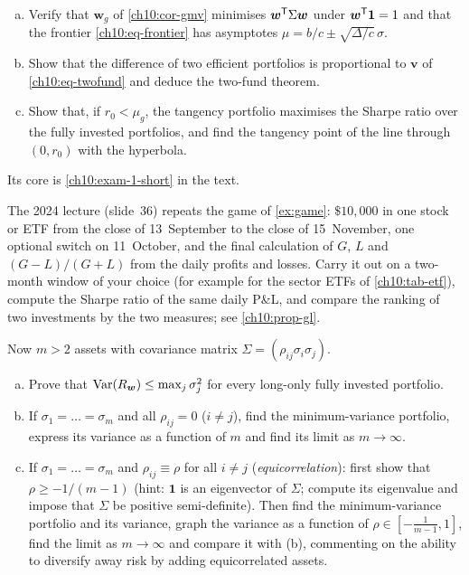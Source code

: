 \begin{paracol}{2}
\begin{exercise}\label{ch10:exam-1}
\leavevmode
\begin{enumerate}[(a)]
  \item Verify that $\bm w_g$ of \cref{ch10:cor-gmv} minimises $\bm w^{\mathsf T}\Sigma\bm w$ under $\bm w^{\mathsf T}\bm 1=1$ and that the frontier
      \eqref{ch10:eq-frontier} has asymptotes $\mu=b/c\pm\sqrt{\Delta/c}\,\sigma$.
  \item Show that the difference of two efficient portfolios is proportional to $\bm v$ of
      \eqref{ch10:eq-twofund} and deduce the two-fund theorem.
  \item Show that, if $r_0<\mu_g$, the tangency portfolio maximises the
      Sharpe ratio over the fully invested portfolios, and find the tangency point of the line through $(0,r_0)$ with the hyperbola.
\end{enumerate}
Its core is \cref{ch10:exam-1-short} in the text.
\end{exercise}

\begin{exercise}\label{ch10:ex-game}
The 2024 lecture (slide~36) repeats the game of \cref{ex:game}: $\$10{,}000$ in one stock or ETF from the close of 13~September to the
close of 15~November, one optional switch on 11~October, and the final calculation of $G$, $L$ and $(G-L)/(G+L)$ from the daily
profits and losses. Carry it out on a two-month window of your choice (for example for the sector ETFs of \cref{ch10:tab-etf}), compute the
Sharpe ratio of the same daily P\&L, and compare the ranking of two investments by the two measures; see \cref{ch10:prop-gl}.
\end{exercise}

\begin{exercise}\label{ch10:ex-ps6-4}
Now $m>2$ assets with covariance matrix $\Sigma=(\rho_{ij}\sigma_i\sigma_j)$.
\begin{enumerate}[(a)]
  \item Prove that $\operatorname{Var}(R_{\bm w})\le\max_j\sigma_j^2$ for every long-only fully invested portfolio.
  \item If $\sigma_1=\dots=\sigma_m$ and all $\rho_{ij}=0$ ($i\neq j$), find the minimum-variance portfolio, express its variance as a function
      of $m$ and find its limit as $m\to\infty$.
  \item If $\sigma_1=\dots=\sigma_m$ and $\rho_{ij}\equiv\rho$ for all $i\neq j$ (\emph{equicorrelation}): first show that
      $\rho\ge-1/(m-1)$ (hint: $\bm 1$ is an eigenvector of $\Sigma$; compute its eigenvalue and impose that $\Sigma$ be positive
      semi-definite). Then find the minimum-variance portfolio and its variance, graph the variance as a function of $\rho\in[-\frac1{m-1},1]$,
      find the limit as $m\to\infty$ and compare it with (b), commenting on the ability to diversify away risk by adding equicorrelated assets.
\end{enumerate}
\end{exercise}


\end{paracol}

